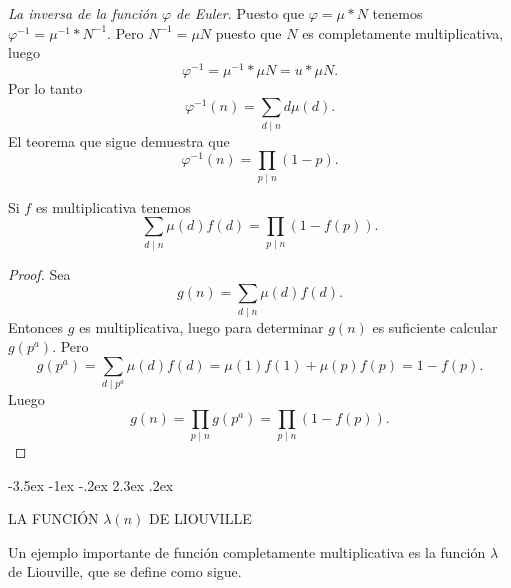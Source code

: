 \documentclass[12pt,a4paper]{book}
\makeatletter
\renewcommand\section{\@startsection{section}{1}{\z@}%
  {-3.5ex \@plus -1ex \@minus -.2ex}%
  {2.3ex \@plus .2ex}%
  {\normalfont\Large\bfseries\raggedright}}
\makeatother
\begin{document}
    \begin{ejemplo}
        \textit{La inversa de la función $\varphi$ de Euler.} Puesto que $\varphi=\mu*N$
        tenemos $\varphi^{-1}=\mu^{-1}*N^{-1}$. Pero $N^{-1}=\mu N$ puesto que $N$ es
        completamente multiplicativa, luego
        \begin{equation*}
            \varphi^{-1}=\mu^{-1}*\mu N=u*\mu N.
        \end{equation*}
        Por lo tanto
        \begin{equation*}
            \varphi^{-1}(n)=\sum_{d\mid n}d\mu(d).
        \end{equation*}
        El teorema que sigue demuestra que
        \begin{equation*}
            \varphi^{-1}(n)=\prod_{p\mid n}(1-p).
        \end{equation*}
    \end{ejemplo}

    \begin{teorema}
        Si $f$ es multiplicativa tenemos
        \begin{equation*}
            \sum_{d\mid n}\mu(d)f(d)=\prod_{p\mid n}(1-f(p)).
        \end{equation*}
    \end{teorema}

    \begin{proof}
        Sea
        \begin{equation*}
            g(n)=\sum_{d\mid n}\mu(d)f(d).
        \end{equation*}
        Entonces $g$ es multiplicativa, luego para determinar $g(n)$ es suficiente calcular
        $g(p^{a})$. Pero
        \begin{equation*}
            g(p^{a})=\sum_{d\mid p^{a}}\mu(d)f(d)=\mu(1)f(1)+\mu(p)f(p)=1-f(p).
        \end{equation*}
        Luego
        \begin{equation*}
            g(n)=\prod_{p\mid n}g(p^{a})=\prod_{p\mid n}(1-f(p)).
        \end{equation*}
    \end{proof}

    \section{LA FUNCIÓN \texorpdfstring{$\lambda(n)$}{λ(n)} DE LIOUVILLE}\label{sim:lam}

    Un ejemplo importante de función completamente multiplicativa es la función $\lambda$
    de Liouville, que se define como sigue.
\end{document}
